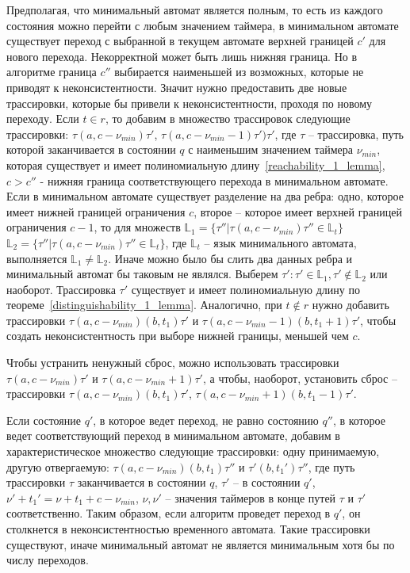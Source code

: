 \documentclass[times,specification,annotation]{itmo-student-thesis}
\begin{document}
Предполагая, что минимальный автомат является полным, то есть из каждого состояния можно перейти с любым значением таймера, в минимальном автомате существует переход с выбранной в текущем
автомате верхней границей $c'$ для нового перехода. Некорректной может быть лишь нижняя граница. Но в алгоритме граница $c''$ выбирается наименьшей из возможных, которые не приводят к неконсистентности.
Значит нужно предоставить две новые трассировки, которые бы привели к неконсистентности, проходя по новому переходу. Если $t \in r$, то добавим в множество трассировок
следующие трассировки: $\tau(a, c - \nu_{min})\tau'$, $\tau(a, c - \nu_{min} - 1)\tau')\tau'$, где $\tau$ -- трассировка, путь которой заканчивается в состоянии $q$ с наименьшим значением таймера 
$\nu_{min}$, которая существует и имеет полиномиальную длину~\ref{reachability_1_lemma}, $c > c''$ - нижняя граница соответствующего перехода в минимальном автомате. 
Если в минимальном автомате существует разделение на два ребра: одно, которое имеет нижней границей 
ограничения $c$, второе -- которое имеет верхней границей ограничения $c - 1$, то для множеств $\mathbb{L}_1 = \{\tau'' | \tau(a, c - \nu_{min})\tau'' \in \mathbb{L}_t \}$
$\mathbb{L}_2 = \{\tau'' | \tau(a, c - \nu_{min})\tau'' \in \mathbb{L}_t \}$, где $\mathbb{L}_t$ -- язык минимального автомата, выполняется $\mathbb{L}_1 \neq \mathbb{L}_2$. 
Иначе можно было бы слить два данных ребра и минимальный автомат бы таковым не являлся. Выберем $\tau': \tau' \in \mathbb{L}_1, \tau' \not\in \mathbb{L}_2$ или наоборот. 
Трассировка $\tau'$ существует и имеет полиномиальную длину по теореме~\ref{distinguishability_1_lemma}. Аналогично, при $t \not\in r$ нужно добавить трассировки $\tau(a, c - \nu_{min})(b, t_1)\tau'$ и
$\tau(a, c - \nu_{min} - 1)(b, t_1 + 1)\tau'$, чтобы создать неконсистентность при выборе нижней границы, меньшей чем $c$.

Чтобы устранить ненужный сброс, можно использовать трассировки $\tau(a, c - \nu_{min})\tau'$ и $\tau(a, c - \nu_{min} + 1)\tau'$, а чтобы, наоборот, установить сброс -- трассировки
$\tau(a, c - \nu_{min})(b, t_1)\tau'$, $\tau(a, c - \nu_{min} + 1)(b, t_1 - 1)\tau'$.

Если состояние $q'$, в которое ведет переход, не равно состоянию $q''$, в которое ведет соответствующий переход в минимальном автомате, добавим в характеристическое множество следующие трассировки: одну
принимаемую, другую отвергаемую:
$\tau(a, c - \nu_{min})(b, t_1)\tau''$ и $\tau'(b, t_1')\tau''$, где путь трассировки $\tau$ заканчивается в состоянии $q$, $\tau'$ -- в состоянии $q'$, $\nu' + t_1' = \nu + t_1 + c - \nu_{min}$,
$\nu, \nu'$ -- значения таймеров в конце путей $\tau$ и $\tau'$ соответственно. Таким образом, если алгоритм проведет переход в $q'$, он столкнется в неконсистентностью временного автомата.
Такие трассировки существуют, иначе минимальный автомат не является минимальным хотя бы по числу переходов.
\end{document}
